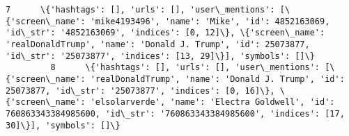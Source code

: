 \documentclass[11pt]{article}
\begin{document}
\begin{Verbatim}[commandchars=\\\{\}]
         7      \{'hashtags': [], 'urls': [], 'user\_mentions': [\{'screen\_name': 'mike4193496', 'name': 'Mike', 'id': 4852163069, 'id\_str': '4852163069', 'indices': [0, 12]\}, \{'screen\_name': 'realDonaldTrump', 'name': 'Donald J. Trump', 'id': 25073877, 'id\_str': '25073877', 'indices': [13, 29]\}], 'symbols': []\}                                                                                                                                                                                                                                                                                                                                                                                                                                                                                                                                                                                                                                                                                                                                                                                                                                                                                                         
         8      \{'hashtags': [], 'urls': [], 'user\_mentions': [\{'screen\_name': 'realDonaldTrump', 'name': 'Donald J. Trump', 'id': 25073877, 'id\_str': '25073877', 'indices': [0, 16]\}, \{'screen\_name': 'elsolarverde', 'name': 'Electra Goldwell', 'id': 760863343384985600, 'id\_str': '760863343384985600', 'indices': [17, 30]\}], 'symbols': []\}                                                                                                                                                                                                                                                                                                                                                                                                                                                                                                                                                                                                                                                                                                                                                                                                                                                                            

\end{Verbatim}
\end{document}
